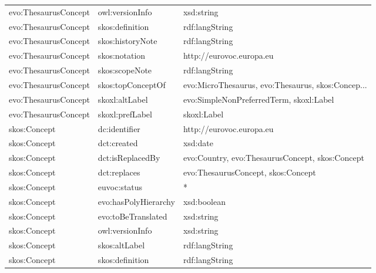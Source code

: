 \documentclass[10pt,a4paper,titlepage,final]{article}
\begin{document}
\begin{tabularx}{\textwidth}{llX}
       evo:ThesaurusConcept &         owl:versionInfo &                                         xsd:string \\
       evo:ThesaurusConcept &         skos:definition &                                     rdf:langString \\
       evo:ThesaurusConcept &        skos:historyNote &                                     rdf:langString \\
       evo:ThesaurusConcept &           skos:notation &                           http://eurovoc.europa.eu \\
       evo:ThesaurusConcept &          skos:scopeNote &                                     rdf:langString \\
       evo:ThesaurusConcept &       skos:topConceptOf &  evo:MicroThesaurus, evo:Thesaurus, skos:Concep... \\
       evo:ThesaurusConcept &          skoxl:altLabel &            evo:SimpleNonPreferredTerm, skoxl:Label \\
       evo:ThesaurusConcept &         skoxl:prefLabel &                                        skoxl:Label \\
               skos:Concept &           dc:identifier &                           http://eurovoc.europa.eu \\
               skos:Concept &             dct:created &                                           xsd:date \\
               skos:Concept &        dct:isReplacedBy &    evo:Country, evo:ThesaurusConcept, skos:Concept \\
               skos:Concept &            dct:replaces &                 evo:ThesaurusConcept, skos:Concept \\
               skos:Concept &            euvoc:status &                                                  * \\
               skos:Concept &    evo:hasPolyHierarchy &                                        xsd:boolean \\
               skos:Concept &      evo:toBeTranslated &                                         xsd:string \\
               skos:Concept &         owl:versionInfo &                                         xsd:string \\
               skos:Concept &           skos:altLabel &                                     rdf:langString \\
               skos:Concept &         skos:definition &                                     rdf:langString \\

\end{tabularx}
\end{document}
